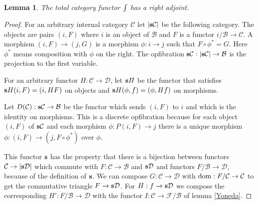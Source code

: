 \documentclass{amsart}
\theoremstyle{plain}
\newtheorem{lemma}[theorem]{Lemma}
\theoremstyle{definition}
\newcommand\hide[1]{}
\newcommand\cat\mathcal
\newcommand\ri{^*}
\begin{document}
\begin{lemma} The total category functor $\mathord{\int}$ has a right adjoint. \end{lemma}

\begin{proof}  %

For an arbitrary internal category $\cat C$ let $|\rat\cat C|$ be the following category. The objects are pairs $(i,F)$ where $i$ is an object of $\cat B$ and $F$ is a functor $i/\cat B \to \cat C$. A morphism $(i,F) \to (j,G)$ is a morphism $\phi:i\to j$ such that $F\circ \phi\ri = G$. Here $\phi\ri$ means composition with $\phi$ on the right. The opfibration $\rat\cat C:|\rat\cat C|\to\cat B$ is the projection to the first variable. %

For an arbitrary functor $H:\cat C \to \cat D$, let $\mathbf{s} H$ be the functor that satisfies $\mathbf{s} H(i,F) = (i,HF)$ on objects and $\mathbf{s} H(\phi,f)=(\phi,Hf)$ on morphisms.

Let $D(\cat C):\rat\cat C \to\cat B$ be the functor which sends $(i,F)$ to $i$ and which is the identity on morphisms. This is a discrete opfibration because for each object $(i,F)$ of $\rat\cat C$ and each morphism $\phi:P(i,F) \to j$ there is a unique morphism $\phi:(i,F) \to (j,F\circ \phi\ri)$ over $\phi$.

This functor $\mathbf{s}$ has the property that there is a bijection between functors $\cat C\to|\rat\cat D|$ which commute with $F:\cat C\to\cat B$ and $\rat \cat D$ and functors $F/\cat B\to \cat D$, because of the definition of $\mathbf{s}$. We can compose $G:\cat C\to\cat D$ with $\dom:F/\cat C \to \cat C$ to get the commutative triangle $F\to \rat \cat D$. For $H:f\to\rat \cat D$ we compose the corresponding $H':F/\cat B \to \cat D$ with the functor $I:\cat C\to \cat F/\cat B$ of lemma \ref{Yoneda}.

\hide{
To see that this functor is adjoint, we define the transposes. 
Let $F:\cat C \to \cat B$ be a discrete opfibration, let $\cat D$ be an arbitrary internal category and let $G:\cat C\to \cat D$ be an arbitrary functor. 
For each object $x$ of $\cat C$ let $G^t(x)$ satisfy $G^t(x) = (F(x),\xi\mapsto G(\xi\cdot x))$; for morphisms $G^t(x)(\phi) = G(\phi_x)$. For a morphism $f:x\to x'$ let $G^t(f) = Ff$. %

}
\end{proof}
\end{document}
